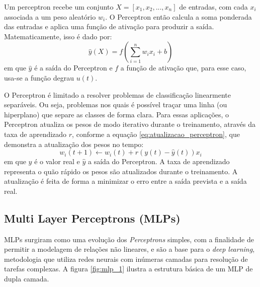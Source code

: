 Um perceptron recebe um conjunto $ X = [x_1, x_2, ..., x_n] $ de entradas,
com cada $ x_i $ associada a um peso aleatório $ w_i $. O Perceptron então calcula a soma ponderada das entradas e aplica uma 
função de ativação para produzir a saída. Matematicamente, isso é dado por:
\begin{equation}
\label{eq:perceptron}
\hat{y}(X) = f\left(\sum_{i=1}^{n} w_i x_i + b\right)
\end{equation}
em que $ \hat{y} $ é a saída do Perceptron e $ f $ a função de ativação que, para esse caso, usa-se a função degrau $ u(t) $.

\begin{figure}[!ht]
	{}
	{}
\end{figure}

O Perceptron é limitado a resolver problemas de classificação linearmente separáveis. Ou seja, problemas nos quais é
possível traçar uma linha (ou hiperplano) que separe as classes de forma clara. Para essas aplicações, o Perceptron
atualiza os pesos de modo iterativo durante o treinamento, através da taxa de aprendizado $ r $, conforme a equação 
\ref{eq:atualizacao_perceptron}, que demonstra a atualização dos pesos no tempo:
\begin{equation}
\label{eq:atualizacao_perceptron}
w_i(t+1) \leftarrow w_i(t) + r (y(t) - \hat{y}(t)) x_i
\end{equation}
em que $ y $ é o valor real e $ \hat{y} $ a saída do Perceptron. A taxa de aprendizado representa o quão rápido
os pesos são atualizados durante o treinamento. A atualização é feita de forma a minimizar o erro entre a saída prevista
e a saída real.


\subsection{Multi Layer Perceptrons (MLPs)}
MLPs surgiram como uma evolução dos \textit{Perceptrons} simples, com a finalidade de permitir a modelagem de relações
não lineares, e são a base para o \textit{deep learning}, metodologia que utiliza redes neurais com inúmeras camadas para
resolução de tarefas complexas. A figura \ref{fig:mlp_1} ilustra a estrutura básica de um MLP de dupla camada.

\begin{figure}[!ht]
	{}
	{}
\end{figure}

